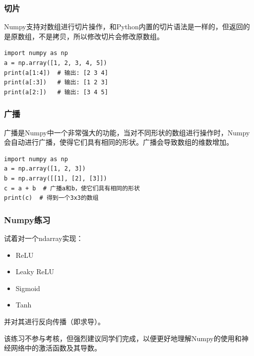 \begin{frame}[fragile]
    \frametitle{切片}

    Numpy支持对数组进行切片操作，和Python内置的切片语法是一样的，但返回的是原数组，不是拷贝，所以修改切片会修改原数组。

    \begin{verbatim}
import numpy as np
a = np.array([1, 2, 3, 4, 5])
print(a[1:4])  # 输出: [2 3 4]
print(a[:3])   # 输出: [1 2 3]
print(a[2:])   # 输出: [3 4 5]
    \end{verbatim}

\end{frame}

\begin{frame}[fragile]
    \frametitle{广播}
    广播是Numpy中一个非常强大的功能，当对不同形状的数组进行操作时，Numpy会自动进行广播，使得它们具有相同的形状。广播会导致数组的维数增加。
    \begin{verbatim}
import numpy as np
a = np.array([1, 2, 3])
b = np.array([[1], [2], [3]])
c = a + b  # 广播a和b，使它们具有相同的形状
print(c)  # 得到一个3x3的数组
    \end{verbatim}

\end{frame}

\begin{frame}
    \frametitle{Numpy练习}

    试着对一个ndarray实现：
    \begin{itemize}
        \item ReLU
        \item Leaky ReLU
        \item Sigmoid
        \item Tanh
    \end{itemize}
    并对其进行反向传播（即求导）。

    该练习不参与考核，但强烈建议同学们完成，以便更好地理解Numpy的使用和神经网络中的激活函数及其导数。

\end{frame}